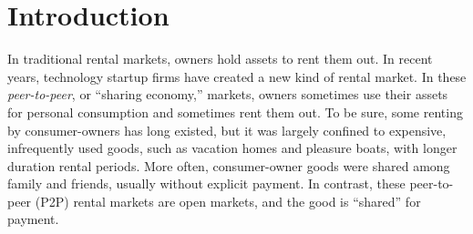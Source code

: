 \documentclass[11pt]{article}
\begin{document}
\onehalfspacing



\section{Introduction}
In traditional rental markets, owners hold assets to rent them out.
In recent years, technology startup firms have created a new kind of rental market.
In these \emph{peer-to-peer}, or ``sharing economy,'' markets, owners sometimes use their assets for personal consumption and sometimes rent them out.
To be sure, some renting by consumer-owners has long existed, but it was largely confined to expensive, infrequently used goods, such as vacation homes and pleasure boats, with longer duration rental periods.
More often, consumer-owner goods were shared among family and friends, usually without explicit payment.
In contrast, these peer-to-peer (P2P) rental markets are open markets, and the good is ``shared'' for payment. 
\end{document}
